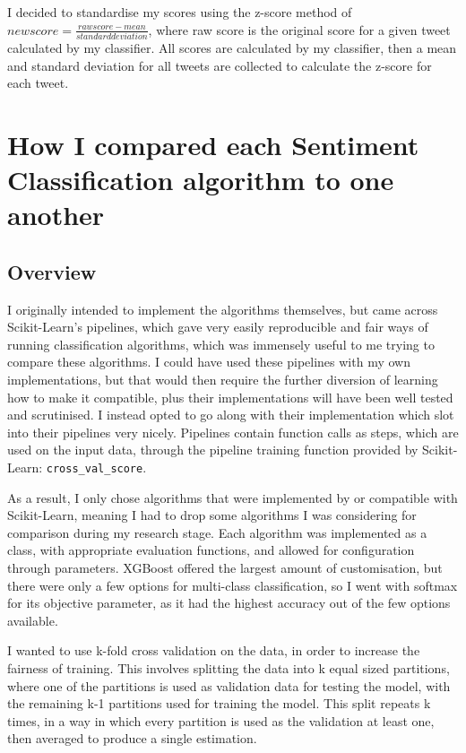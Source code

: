 \documentclass{article}
\begin{document}
I decided to standardise my scores using the z-score method of $new score = \frac{raw score - mean}{standard deviation}$, where raw score is the original score for a given tweet calculated by my classifier.
All scores are calculated by my classifier, then a mean and standard deviation for all tweets are collected to calculate the z-score for each tweet.

\newpage
\section{How I compared each Sentiment Classification algorithm to one another}

\subsection{Overview}

I originally intended to implement the algorithms themselves, but came across Scikit-Learn's pipelines, which gave very easily reproducible and fair ways of running classification algorithms, which was immensely useful to me trying to compare these algorithms.
I could have used these pipelines with my own implementations, but that would then require the further diversion of learning how to make it compatible, plus their implementations will have been well tested and scrutinised.
I instead opted to go along with their implementation which slot into their pipelines very nicely.
Pipelines contain function calls as steps, which are used on the input data, through the pipeline training function provided by Scikit-Learn: \lstinline{cross_val_score}.

As a result, I only chose algorithms that were implemented by or compatible with Scikit-Learn, meaning I had to drop some algorithms I was considering for comparison during my research stage.
Each algorithm was implemented as a class, with appropriate evaluation functions, and allowed for configuration through parameters.
XGBoost offered the largest amount of customisation, but there were only a few options for multi-class classification, so I went with softmax for its objective parameter, as it had the highest accuracy out of the few options available.

I wanted to use k-fold cross validation on the data, in order to increase the fairness of training.
This involves splitting the data into k equal sized partitions, where one of the partitions is used as validation data for testing the model, with the remaining k-1 partitions used for training the model.
This split repeats k times, in a way in which every partition is used as the validation at least one, then averaged to produce a single estimation.
\end{document}
